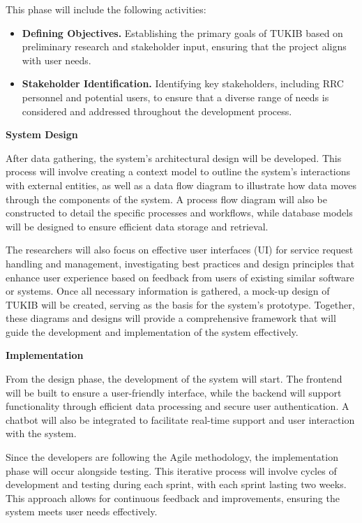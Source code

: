 This phase will include the following activities:

\begin{itemize}
	\item \textbf{Defining Objectives.} Establishing the primary goals of TUKIB based on preliminary research and stakeholder input, ensuring that the project aligns with user needs.
	\item \textbf{Stakeholder Identification.} Identifying key stakeholders, including RRC personnel and potential users, to ensure that a diverse range of needs is considered and addressed throughout the development process.
\end{itemize}
	
\noindent\textbf{System Design}
	
After data gathering, the system's architectural design will be developed. This process will involve creating a context model to outline the system's interactions with external entities, as well as a data flow diagram to illustrate how data moves through the components of the system. A process flow diagram will also be constructed to detail the specific processes and workflows, while database models will be designed to ensure efficient data storage and retrieval. 

The researchers will also focus on effective user interfaces (UI) for service request handling and management, investigating best practices and design principles that enhance user experience based on feedback from users of existing similar software or systems. Once all necessary information is gathered, a mock-up design of TUKIB will be created, serving as the basis for the system's prototype. Together, these diagrams and designs will provide a comprehensive framework that will guide the development and implementation of the system effectively.\newline
	
\noindent\textbf{Implementation}
	
From the design phase, the development of the system will start. The frontend will be built to ensure a user-friendly interface, while the backend will support functionality through efficient data processing and secure user authentication. A chatbot will also be integrated to facilitate real-time support and user interaction with the system.

Since the developers are following the Agile methodology, the implementation phase will occur alongside testing. This iterative process will involve cycles of development and testing during each sprint, with each sprint lasting two weeks. This approach allows for continuous feedback and improvements, ensuring the system meets user needs effectively.\newline
	
